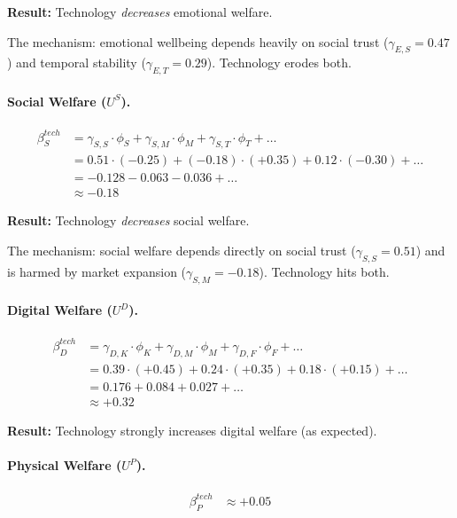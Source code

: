 \textbf{Result:} Technology \emph{decreases} emotional welfare.

The mechanism: emotional wellbeing depends heavily on social trust ($\gamma_{E,S} = 0.47$) 
and temporal stability ($\gamma_{E,T} = 0.29$). Technology erodes both.

\paragraph{Social Welfare ($U^S$).}
\begin{align}
\beta_S^{tech} &= \gamma_{S,S} \cdot \phi_S + \gamma_{S,M} \cdot \phi_M + \gamma_{S,T} \cdot \phi_T + \ldots \nonumber \\
&= 0.51 \cdot (-0.25) + (-0.18) \cdot (+0.35) + 0.12 \cdot (-0.30) + \ldots \nonumber \\
&= -0.128 - 0.063 - 0.036 + \ldots \nonumber \\
&\approx \mathbf{-0.18}
\end{align}

\textbf{Result:} Technology \emph{decreases} social welfare.

The mechanism: social welfare depends directly on social trust ($\gamma_{S,S} = 0.51$) 
and is harmed by market expansion ($\gamma_{S,M} = -0.18$). Technology hits both.

\paragraph{Digital Welfare ($U^D$).}
\begin{align}
\beta_D^{tech} &= \gamma_{D,K} \cdot \phi_K + \gamma_{D,M} \cdot \phi_M + \gamma_{D,F} \cdot \phi_F + \ldots \nonumber \\
&= 0.39 \cdot (+0.45) + 0.24 \cdot (+0.35) + 0.18 \cdot (+0.15) + \ldots \nonumber \\
&= 0.176 + 0.084 + 0.027 + \ldots \nonumber \\
&\approx \mathbf{+0.32}
\end{align}

\textbf{Result:} Technology strongly increases digital welfare (as expected).

\paragraph{Physical Welfare ($U^P$).}
\begin{align}
\beta_P^{tech} &\approx \mathbf{+0.05}
\end{align}

